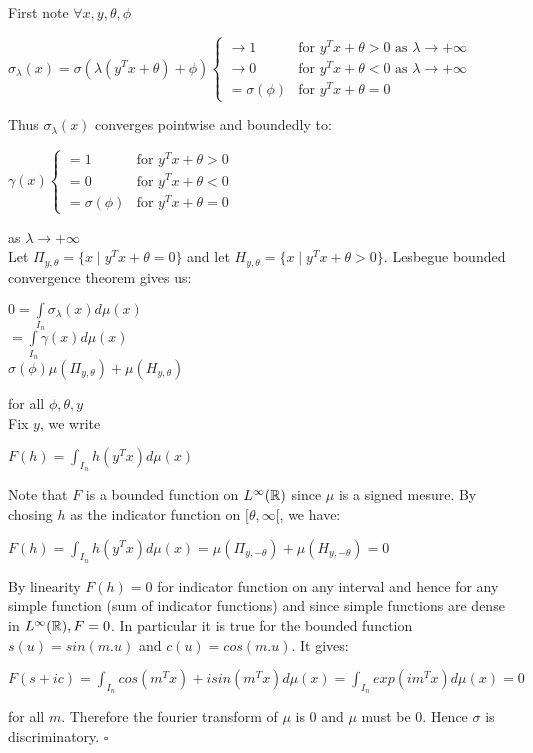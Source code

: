 \documentclass[12pt, a4paper]{article}
\newenvironment{proof}{{\sc Proof:}}{\hfill $\square$}
\begin{document}
  \begin{proof}
    First note $\forall x,y,\theta, \phi$ 
\begin{center}
  $\sigma_\lambda(x) = \sigma(\lambda (y^Tx + \theta) + \phi)
  \begin{cases}
    \to 1 &\text{for $y^Tx+\theta > 0$ as $\lambda \to +\infty$}\\
    \to 0 &\text{for $y^Tx+\theta < 0$ as $\lambda \to +\infty$}\\
    =\sigma(\phi) & \text{for $y^Tx+\theta = 0$}
  \end{cases}$
\end{center}
Thus $\sigma_\lambda(x)$ converges pointwise and boundedly to:

\begin{center}
  $\gamma(x)
  \begin{cases}
    =1 &\text{for $y^Tx+\theta > 0$}\\
    =0 &\text{for $y^Tx+\theta < 0$}\\
    =\sigma(\phi) & \text{for $y^Tx+\theta = 0$}
  \end{cases}$
\end{center}
as $\lambda \to +\infty$\\
\sv
Let $\Pi_{y,\theta} = \{x \mid y^Tx+\theta = 0\}$ and let $H_{y,\theta} = \{x \mid y^Tx + \theta > 0\}$. Lesbegue bounded convergence theorem gives us:\\
\begin{center}
  $0 = \int\limits_{I_n}\sigma_\lambda(x)d\mu(x)$\\
  $ = \int\limits_{I_n} \gamma(x)d\mu(x)$\\
  $\sigma(\phi)\mu(\Pi_{y,\theta}) + \mu(H_{y,\theta})$
\end{center}
for all $\phi, \theta, y$\\
\sv
Fix $y$, we write \\
\begin{center}
  $F(h) = \int_{I_n}h(y^Tx)d\mu(x)$
\end{center}
Note that $F$ is a bounded function on $L^\infty(\mathbb{R})$ since $\mu$ is a signed mesure. By chosing  $h$ as the indicator function on $[\theta, \infty[$, we have:
\begin{center}
  $F(h) = \int_{I_n} h(y^Tx) d\mu(x) = \mu(\Pi_{y,-\theta}) + \mu(H_{y,-\theta}) = 0$
\end{center}
By linearity $F(h) = 0$ for indicator function on any interval and hence for any simple function (sum of indicator functions) and since simple functions are dense in $L^{\infty}(\mathbb{R}), F = 0$.
In particular it is true for the bounded function $s(u) = sin(m.u)$ and $c(u) = cos(m.u)$. It gives:
\begin{center}
  $F(s+ic) = \int_{I_n} cos(m^Tx) + i sin(m^Tx) d\mu(x) = \int_{I_n} exp(im^Tx)d\mu(x) = 0$
\end{center}
for all $m$. Therefore the fourier transform of $\mu$ is 0 and $\mu$ must be 0. Hence $\sigma$ is discriminatory.
  \end{proof}\\
\end{document}
